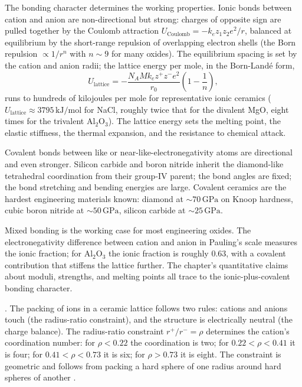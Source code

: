 The bonding character determines the working properties. Ionic bonds
between cation and anion are non-directional but strong: charges of
opposite sign are pulled together by the Coulomb attraction
$U_{\text{Coulomb}} = -k_e z_1 z_2 e^2/r$, balanced at equilibrium by
the short-range repulsion of overlapping electron shells (the Born
repulsion $\propto 1/r^n$ with $n \sim 9$ for many oxides). The
equilibrium spacing is set by the cation and anion radii; the lattice
energy per mole, in the Born-Land\'e form,
\[
U_{\text{lattice}} = -\frac{N_A M k_e z^+ z^- e^2}{r_0}
\left(1 - \frac{1}{n}\right),
\]
runs to hundreds of kilojoules per mole for representative ionic
ceramics ($U_{\text{lattice}} \approx 3795\,\text{kJ/mol}$ for NaCl,
roughly twice that for the divalent MgO, eight times for the trivalent
$\mathrm{Al_2O_3}$). The lattice energy sets the melting point, the
elastic stiffness, the thermal expansion, and the resistance to
chemical attack.

Covalent bonds between like or near-like-electronegativity atoms are
directional and even stronger. Silicon carbide and boron nitride
inherit the diamond-like tetrahedral coordination from their group-IV
parent; the bond angles are fixed; the bond stretching and bending
energies are large. Covalent ceramics are the hardest engineering
materials known: diamond at $\sim 70\,\text{GPa}$ on Knoop hardness,
cubic boron nitride at $\sim 50\,\text{GPa}$, silicon carbide at
$\sim 25\,\text{GPa}$.

Mixed bonding is the working case for most engineering oxides. The
electronegativity difference between cation and anion in Pauling's
scale measures the ionic fraction; for $\mathrm{Al_2O_3}$ the ionic
fraction is roughly $0.63$, with a covalent contribution that
stiffens the lattice further. The chapter's quantitative claims about
moduli, strengths, and melting points all trace to the
ionic-plus-covalent bonding character.

. The packing of ions in a ceramic lattice
follows two rules: cations and anions touch (the radius-ratio
constraint), and the structure is electrically neutral (the charge
balance). The radius-ratio constraint
$r^+/r^- = \rho$ determines the cation's coordination number: for
$\rho < 0.22$ the coordination is two; for $0.22 < \rho < 0.41$ it is
four; for $0.41 < \rho < 0.73$ it is six; for $\rho > 0.73$ it is eight.
The constraint is geometric and follows from packing a hard sphere
of one radius around hard spheres of another \cite[ch.~2]{
text:kingery-ceramics}.

